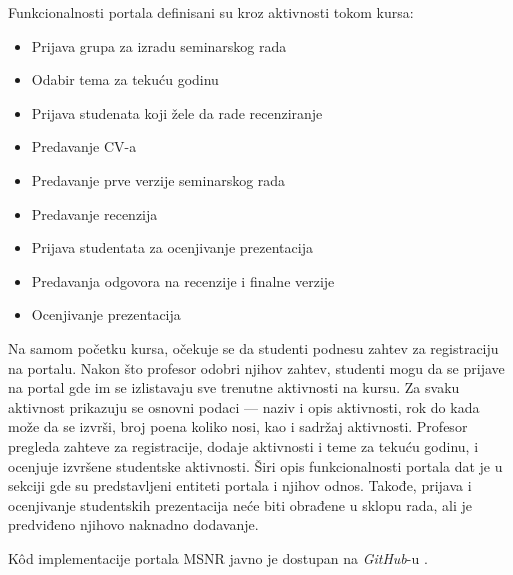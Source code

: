 \documentclass[12pt,oneside]{memoir}
\begin{document}
Funkcionalnosti portala definisani su kroz aktivnosti tokom kursa:
\begin{itemize}
  \item Prijava grupa za izradu seminarskog rada
  \item Odabir tema za tekuću godinu
  \item Prijava studenata koji žele da rade recenziranje
  \item Predavanje CV-a
  \item Predavanje prve verzije seminarskog rada
  \item Predavanje recenzija
  \item Prijava studentata za ocenjivanje prezentacija
  \item Predavanja odgovora na recenzije i finalne verzije
  \item Ocenjivanje prezentacija 
\end{itemize}


Na samom početku kursa, očekuje se da studenti podnesu zahtev za registraciju na portalu. Nakon što profesor odobri njihov zahtev,
studenti mogu da se prijave na portal gde im se izlistavaju sve trenutne aktivnosti na kursu. Za svaku aktivnost prikazuju se osnovni
podaci --- naziv i opis aktivnosti, rok do kada može da se izvrši, broj poena koliko nosi, kao i sadržaj aktivnosti. Profesor pregleda
zahteve za registracije, dodaje aktivnosti i teme za tekuću godinu, i ocenjuje izvršene studentske aktivnosti.
Širi opis funkcionalnosti portala dat je u sekciji gde su predstavljeni entiteti portala i njihov odnos. Takođe, prijava i ocenjivanje
studentskih prezentacija neće biti obrađene u sklopu rada, ali je predviđeno njihovo naknadno dodavanje.

K\^{o}d implementacije portala MSNR javno je dostupan na \emph{GitHub}-u \cite{msnr-portal}.
\end{document}
